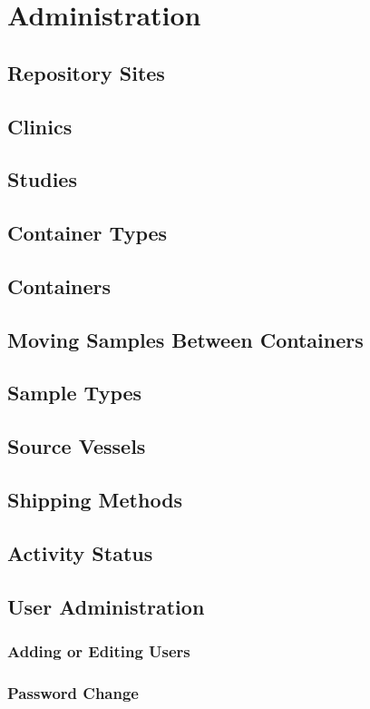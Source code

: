 \chapter{Administration}
\label{chap:administration}

\section{Repository Sites}
\section{Clinics}
\section{Studies}
\section{Container Types}
\section{Containers}
\section{Moving Samples Between Containers}
\section{Sample Types}
\section{Source Vessels}
\section{Shipping Methods}
\section{Activity Status}
\section{User Administration}
\subsection{Adding or Editing Users}
\subsection{Password Change}

